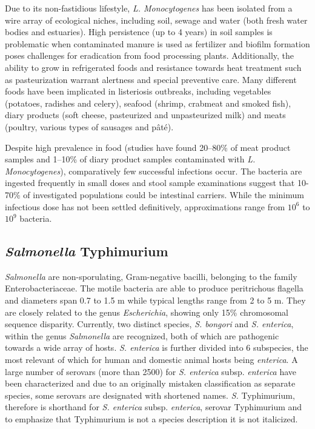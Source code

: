 Due to its non-fastidious lifestyle, \textit{L. Monocytogenes} has been isolated from a wire array of ecological niches, including soil, sewage and water (both fresh water bodies and estuaries). High persistence (up to 4 years) in soil samples is problematic when contaminated manure is used as fertilizer and biofilm formation poses challenges for eradication from food processing plants. Additionally, the ability to grow in refrigerated foods and resistance towards heat treatment such as pasteurization warrant alertness and special preventive care. Many different foods have been implicated in listeriosis outbreaks, including vegetables (potatoes, radishes and celery), seafood (shrimp, crabmeat and smoked fish), diary products (soft cheese, pasteurized and unpasteurized milk) and meats (poultry, various types of sausages and pâté).

Despite high prevalence in food (studies have found 20--80\% of meat product samples and 1--10\% of diary product samples contaminated with \textit{L. Monocytogenes}), comparatively few successful infections occur. The bacteria are ingested frequently in small doses and stool sample examinations suggest that 10-70\% of investigated populations could be intestinal carriers. While the minimum infectious dose has not been settled definitively, approximations range from $10^6$ to $10^9$ bacteria.

\subsection{\textit{Salmonella} Typhimurium}
\textit{Salmonella} are non-sporulating, Gram-negative bacilli, belonging to the family Enterobacteriaceae. The motile bacteria are able to produce peritrichous flagella and diameters span 0.7 to 1.5 \textmu m while typical lengths range from 2 to 5 \textmu m. They are closely related to the genus \textit{Escherichia}, showing only 15\% chromosomal sequence disparity. Currently, two distinct species, \textit{S. bongori} and \textit{S. enterica}, within the genus \textit{Salmonella} are recognized, both of which are pathogenic towards a wide array of hosts. \textit{S. enterica} is further divided into 6 subspecies, the most relevant of which for human and domestic animal hosts being \textit{enterica}. A large number of serovars (more than 2500) for \textit{S. enterica} subsp. \textit{enterica} have been characterized and due to an originally mistaken classification as separate species, some serovars are designated with shortened names. \textit{S.} Typhimurium, therefore is shorthand for \textit{S. enterica} subsp. \textit{enterica}, serovar Typhimurium and to emphasize that Typhimurium is not a species description it is not italicized.

